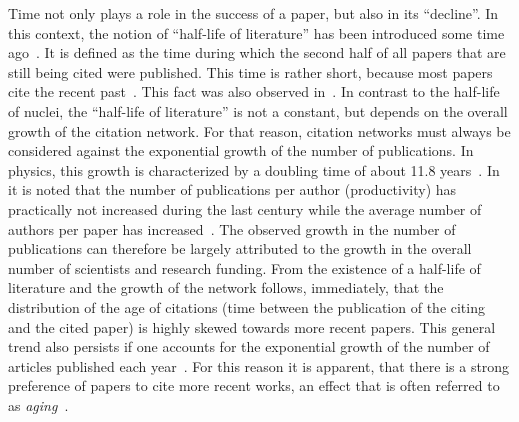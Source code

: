 \documentclass[draft,final]{vutinfth} %
\begin{document}
Time not only plays a role in the success of a paper, but also in its ``decline''. In this context, the notion of ``half-life of literature'' has been introduced some time ago~\cite{Burton1960}. It is defined as the time during which the second half of all papers that are still being cited were published. This time is rather short, because most papers cite the recent past~\cite{Burton1960}. This fact was also observed in~\cite{deSollaPrice1965, Redner2005}. In contrast to the  half-life of nuclei, the ``half-life of literature'' is not a constant, but depends on the overall growth of the citation network. For that reason, citation networks must always be considered against the exponential growth of the number of publications. In physics, this growth is characterized by a doubling time of about 11.8 years~\cite{Martin2013}. In ~\cite{Martin2013, Fanelli2016} it is noted that the number of publications per author (productivity) has practically not increased during the last century while the average number of authors per paper has increased~\cite{Martin2013}. The observed growth in the number of publications can therefore be largely attributed to the growth in the overall number of scientists and research funding. From the existence of a half-life of literature and the growth of the network follows, immediately, that the distribution of the age of citations (time between the publication of the citing and the cited paper) is highly skewed towards more recent papers. 
This general trend also persists if one accounts for the exponential growth of the number of articles published each year~\cite{Redner2005}. For this reason it is apparent, that there is a strong preference of papers to cite more recent works, an effect that is often referred to as \textit{aging}~\cite{Wang2013x, Yin2017}.
\end{document}
